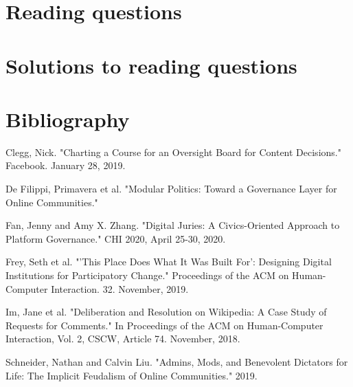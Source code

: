 \documentclass[class=book, crop=false]{standalone}
\begin{document}
\section{Reading questions}

\section{Solutions to reading questions}

\section{Bibliography}

Clegg, Nick. "Charting a Course for an Oversight Board for Content Decisions." Facebook. January 28, 2019.

De Filippi, Primavera et al. "Modular Politics: Toward a Governance Layer for Online Communities."

Fan, Jenny and Amy X. Zhang. "Digital Juries: A Civics-Oriented Approach to Platform Governance." CHI 2020, April 25-30, 2020.

Frey, Seth et al. "'This Place Does What It Was Built For': Designing Digital Institutions for Participatory Change." Proceedings of the ACM on Human-Computer Interaction. 32. November, 2019.

Im, Jane et al. "Deliberation and Resolution on Wikipedia: A Case Study of Requests for Comments." In Proceedings of the ACM on Human-Computer Interaction, Vol. 2, CSCW, Article 74. November, 2018.

Schneider, Nathan and Calvin Liu. "Admins, Mods, and Benevolent Dictators for Life: The Implicit Feudalism of Online Communities." 2019.
\end{document}
